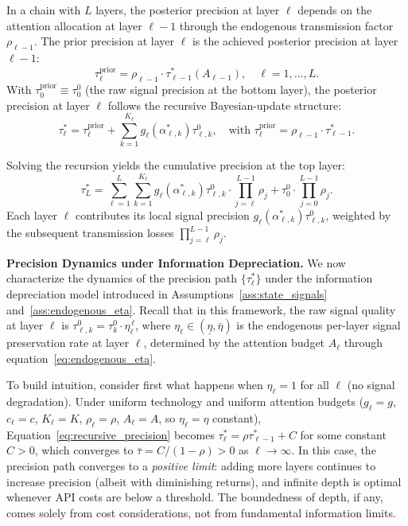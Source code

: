 In a chain with $L$ layers, the posterior precision at layer $\ell$ depends on the attention allocation at layer $\ell-1$ through the endogenous transmission factor $\rho_{\ell-1}$. The prior precision at layer $\ell$ is the achieved posterior precision at layer $\ell-1$:
\begin{equation}\label{eq:prior_update}
\tau^{\text{prior}}_\ell = \rho_{\ell-1} \cdot \tau^*_{\ell-1}(A_{\ell-1}), \quad \ell = 1, \ldots, L.
\end{equation}
With $\tau^{\text{prior}}_0 \equiv \tau^0_0$ (the raw signal precision at the bottom layer), the posterior precision at layer $\ell$ follows the recursive Bayesian-update structure:
\begin{equation}\label{eq:recursive_precision}
\tau^*_\ell = \tau^{\text{prior}}_\ell + \sum_{k=1}^{K_\ell} g_\ell(\alpha^*_{\ell,k}) \tau^0_{\ell,k}, \quad \text{with } \tau^{\text{prior}}_\ell = \rho_{\ell-1} \cdot \tau^*_{\ell-1}.
\end{equation}

Solving the recursion yields the cumulative precision at the top layer:
\begin{equation}\label{eq:top_precision}
\tau^*_L = \sum_{\ell=1}^{L} \sum_{k=1}^{K_\ell} g_\ell(\alpha^*_{\ell,k}) \tau^0_{\ell,k} \cdot \prod_{j=\ell}^{L-1} \rho_j + \tau^0_0 \cdot \prod_{j=0}^{L-1} \rho_j.
\end{equation}
Each layer $\ell$ contributes its local signal precision $g_\ell(\alpha^*_{\ell,k}) \tau^0_{\ell,k}$, weighted by the subsequent transmission losses $\prod_{j=\ell}^{L-1} \rho_j$.

\vspace{1em}
\noindent\textbf{Precision Dynamics under Information Depreciation.}
We now characterize the dynamics of the precision path $\{\tau^*_\ell\}$ under the information depreciation model introduced in Assumptions~\ref{ass:state_signals} and~\ref{ass:endogenous_eta}. Recall that in this framework, the raw signal quality at layer $\ell$ is $\tau^0_{\ell,k} = \tau^0_k \cdot \eta_\ell^{\,\ell}$, where $\eta_\ell \in (\underline{\eta}, \bar{\eta})$ is the endogenous per-layer signal preservation rate at layer $\ell$, determined by the attention budget $A_\ell$ through equation~\eqref{eq:endogenous_eta}.

To build intuition, consider first what happens when $\eta_\ell = 1$ for all $\ell$ (no signal degradation). Under uniform technology and uniform attention budgets ($g_\ell = g$, $c_\ell = c$, $K_\ell = K$, $\rho_\ell = \rho$, $A_\ell = A$, so $\eta_\ell = \eta$ constant), Equation~\eqref{eq:recursive_precision} becomes $\tau^*_\ell = \rho \tau^*_{\ell-1} + C$ for some constant $C > 0$, which converges to $\bar{\tau} = C/(1-\rho) > 0$ as $\ell \to \infty$. In this case, the precision path converges to a \emph{positive limit}: adding more layers continues to increase precision (albeit with diminishing returns), and infinite depth is optimal whenever API costs are below a threshold. The boundedness of depth, if any, comes solely from cost considerations, not from fundamental information limits.

